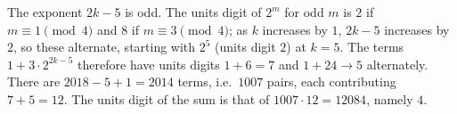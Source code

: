 The exponent $2k-5$ is odd. The units digit of $2^m$ for odd $m$ is $2$ if $m\equiv1\pmod4$ and $8$ if $m\equiv3\pmod4$; as $k$ increases by $1$, $2k-5$ increases by $2$, so these alternate, starting with $2^5$ (units digit $2$) at $k=5$. The terms $1+3\cdot2^{2k-5}$ therefore have units digits $1+6=7$ and $1+24\to5$ alternately. There are $2018-5+1=2014$ terms, i.e.\ $1007$ pairs, each contributing $7+5=12$. The units digit of the sum is that of $1007\cdot12=12084$, namely $\boxed{4}$.
